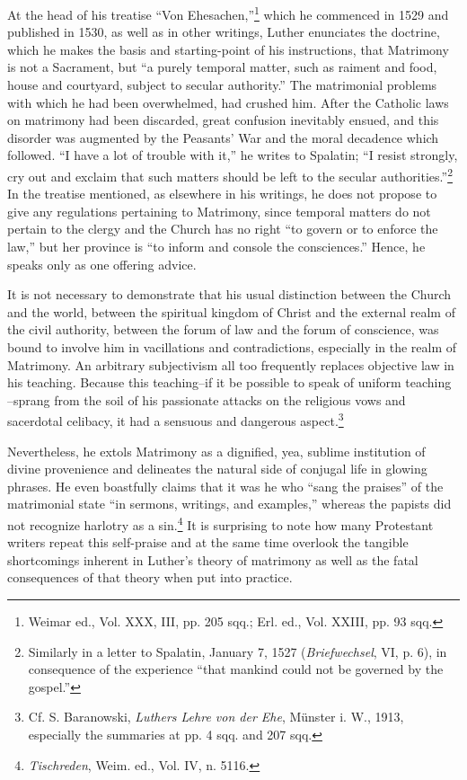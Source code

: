 At the head of his treatise “Von Ehesachen,”\footnote{Weimar ed., Vol. XXX, III, pp. 205 sqq.; Erl. ed., Vol. XXIII, pp. 93 sqq.}
 which he commenced
in 1529 and published in 1530, as well as in other writings,
Luther enunciates the doctrine, which he makes the basis and starting-point
of his instructions, that Matrimony is not a Sacrament, but
“a purely temporal matter, such as raiment and food, house and courtyard,
subject to secular authority.” The matrimonial problems with
which he had been overwhelmed, had crushed him. After the Catholic
laws on matrimony had been discarded, great confusion inevitably
ensued, and this disorder was augmented by the Peasants’ War and the
moral decadence which followed. “I have a lot of trouble with it,”
he writes to Spalatin; “I resist strongly, cry out and exclaim that such
matters should be left to the secular authorities.”\footnote{Similarly in a letter to Spalatin, January 7, 1527 (\textit{Briefwechsel}, VI, p. 6), in consequence
of the experience “that mankind could not be governed by the gospel.”}
In the treatise
mentioned, as elsewhere in his writings, he does not propose to give
any regulations pertaining to Matrimony, since temporal matters do
not pertain to the clergy and the Church has no right “to govern or to
enforce the law,” but her province is “to inform and console the
consciences.” Hence, he speaks only as one offering advice.

It is not necessary to demonstrate that his usual distinction between
the Church and the world, between the spiritual kingdom of Christ
and the external realm of the civil authority, between the forum of law
and the forum of conscience, was bound to involve him in vacillations
and contradictions, especially in the realm of Matrimony. An arbitrary
subjectivism all too frequently replaces objective law in his teaching.
Because this teaching--if it be possible to speak of uniform teaching
--sprang from the soil of his passionate attacks on the religious vows
and sacerdotal celibacy, it had a sensuous and dangerous aspect.\footnote
{Cf. S. Baranowski, \textit{Luthers Lehre von der Ehe}, Münster i. W., 1913, especially the
summaries at pp. 4 sqq. and 207 sqq.}

Nevertheless, he extols Matrimony as a dignified, yea, sublime institution
of divine provenience and delineates the natural side of conjugal
life in glowing phrases. He even boastfully claims that it was he who
“sang the praises” of the matrimonial state “in sermons, writings, and
examples,” whereas the papists did not recognize harlotry as a sin.\footnote
{\textit{Tischreden}, Weim. ed., Vol. IV, n. 5116.}
It is surprising to note how many Protestant writers repeat this self-praise
and at the same time overlook the tangible shortcomings inherent
in Luther’s theory of matrimony as well as the fatal consequences
of that theory when put into practice.

